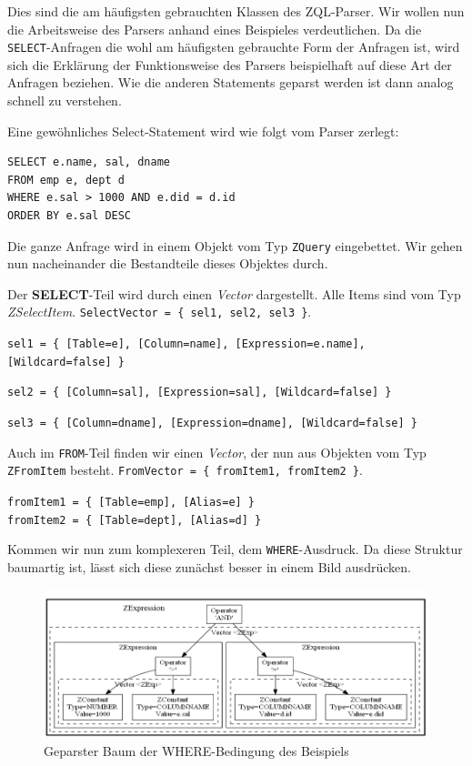 Dies sind die am häufigsten gebrauchten Klassen des ZQL-Parser. Wir wollen nun die Arbeitsweise des Parsers anhand eines Beispieles verdeutlichen. Da die \verb|SELECT|-Anfragen die wohl am häufigsten gebrauchte Form der Anfragen ist, wird sich die Erklärung der Funktionsweise des Parsers beispielhaft auf diese Art der Anfragen beziehen. Wie die anderen Statements geparst werden ist dann analog schnell zu verstehen.


Eine gewöhnliches Select-Statement wird wie folgt vom Parser zerlegt:
\begin{verbatim}
SELECT e.name, sal, dname 
FROM emp e, dept d 
WHERE e.sal > 1000 AND e.did = d.id 
ORDER BY e.sal DESC\end{verbatim}

Die ganze Anfrage wird in einem Objekt vom Typ \verb|ZQuery| eingebettet. Wir gehen nun nacheinander die Bestandteile dieses Objektes durch. 

Der \textbf{SELECT}-Teil wird durch einen \textit{Vector} dargestellt. Alle Items sind vom Typ \textit{ZSelectItem}. \verb|SelectVector = { sel1, sel2, sel3 }|.

\verb|sel1 = { [Table=e], [Column=name], [Expression=e.name], [Wildcard=false] }|

\verb|sel2 = { [Column=sal], [Expression=sal], [Wildcard=false] }|

\verb|sel3 = { [Column=dname], [Expression=dname], [Wildcard=false] }|

Auch im \verb|FROM|-Teil finden wir einen \textit{Vector}, der nun aus Objekten vom Typ \verb|ZFromItem| besteht. \verb|FromVector = { fromItem1, fromItem2 }|.

\verb|fromItem1 = { [Table=emp], [Alias=e] }|\\
\verb|fromItem2 = { [Table=dept], [Alias=d] }|

Kommen wir nun zum komplexeren Teil, dem \verb|WHERE|-Ausdruck. Da diese Struktur baumartig ist, lässt sich diese zunächst besser in einem Bild ausdrücken.

\begin{figure}[H]
\centering
\includegraphics[scale=0.49]{Bilder/where_teil.png}
\caption{Geparster Baum der WHERE-Bedingung des Beispiels}
\label{fig:parseTree}
\end{figure}

